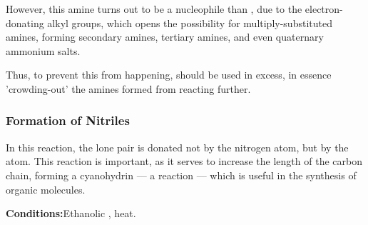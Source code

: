 

				However, this amine turns out to be a  nucleophile than , due to the electron-donating alkyl groups,
				which opens the possibility for multiply-substituted amines, forming secondary amines, tertiary amines, and even
				quaternary ammonium salts.


				Thus, to prevent this from happening,  should be used in excess, in essence 'crowding-out' the amines formed
				from reacting further.




			\pagebreak
			\subsubsection{Formation of Nitriles}

				In this reaction, the lone pair is donated not by the nitrogen atom, but by the  atom. This reaction is
				important, as it serves to increase the length of the carbon chain, forming a cyanohydrin --- a 
				reaction --- which is useful in the synthesis of organic molecules.

				\vspace{1.5em}
				\vbox{\textbf{Conditions:}\tabto{35mm}Ethanolic , heat.}

